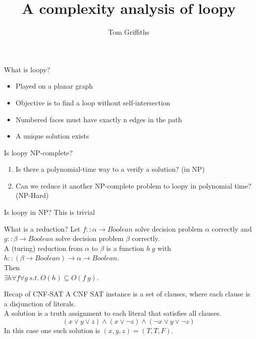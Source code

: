 \documentclass{beamer}
\title{A complexity analysis of loopy}
\author{Tom Griffiths}
\begin{document}
\begin{frame}
    \titlepage
\end{frame}

\begin{frame}{What is loopy?}
    \begin{itemize}
        \item Played on a planar graph
        \item Objective is to find a loop without self-intersection
        \item Numbered faces must have exactly n edges in the path
        \item A unique solution exists
    \end{itemize}
\end{frame}

\begin{frame}{Is loopy NP-complete?}
    \begin{enumerate}
        \item Is there a polynomial-time way to a verify a solution? (in NP)
        \item Can we reduce it another NP-complete problem to loopy in polynomial time? (NP-Hard)
    \end{enumerate}
\end{frame}

\begin{frame}{Is loopy in NP?}
    This is trivial
    
\end{frame}

\begin{frame}{What is a reduction?}
    Let $f::\alpha \rightarrow Boolean$ solve decision problem $\alpha$ correctly and $g::\beta \rightarrow Boolean$ solve decision problem $\beta$ correctly. \\
    A (turing) reduction from $\alpha$ to $\beta$ is a function $h\ g$ with $h::(\beta \rightarrow Boolean) \rightarrow \alpha \rightarrow Boolean$. \footnotemark \\
    Then \\
    $\exists h\forall f\forall g\ s.t.\ O(h)\subseteq O(f\ g)$.
\end{frame}

\begin{frame}{Recap of CNF-SAT}
    A CNF SAT instance is a set of clauses, where each clause is a disjunction of literals. \\
    A solution is a truth assignment to each literal that satisfies all clauses.
    $$(x\lor y\lor z)\land (x\lor \neg z)\land (\neg x\lor y\lor \neg z)$$
    In this case one such solution is $(x, y, z) = (T, T, F)$.
\end{frame}
\end{document}
